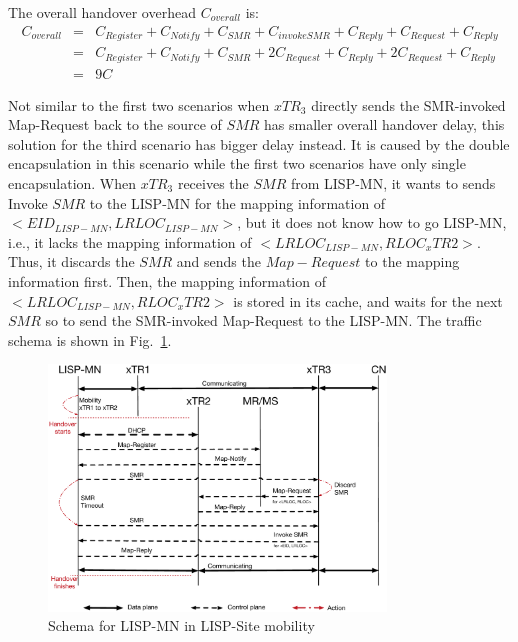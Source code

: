 {The overall handover overhead $C_{overall}$ is:
\begin{eqnarray}
C_{overall} &=& C_{Register} + C_{Notify} + C_{SMR} + C_{invokeSMR} + C_{Reply} + C_{Request} + C_{Reply} \nonumber \\
&=& C_{Register} + C_{Notify} + C_{SMR} + 2C_{Request} + C_{Reply} + 2C_{Request} + C_{Reply} \nonumber \\
&=& 9 C
\end{eqnarray}

Not similar to the first two scenarios when $xTR_3$ directly sends the SMR-invoked Map-Request back to the source of $SMR$ has smaller overall handover delay, this solution for the third scenario has bigger delay instead. It is caused by the double encapsulation in this scenario while the first two scenarios have only single encapsulation. When $xTR_3$ receives the $SMR$ from LISP-MN, it wants to sends Invoke $SMR$ to the LISP-MN for the mapping information of $<EID_{LISP-MN}, LRLOC_{LISP-MN}>$, but it does not know how to go LISP-MN, i.e., it lacks the mapping information of $<LRLOC_{LISP-MN}, RLOC_xTR2>$. Thus, it discards the $SMR$ and sends the $Map-Request$ to the mapping information first. Then, the mapping information of $<LRLOC_{LISP-MN}, RLOC_xTR2>$ is stored in its cache, and waits for the next $SMR$ so to send the SMR-invoked Map-Request to the LISP-MN. The traffic schema is shown in Fig.~\ref{Mobility_double_encap_schema_SMR_askxTR_simplify}.
\begin{figure}[!th]
	\centering
	\includegraphics[width=0.8\textwidth]{Pics/Mobility_double_encap_schema_SMR_askxTR_simplify}
	\caption{Schema for LISP-MN in LISP-Site mobility}
	\label{Mobility_double_encap_schema_SMR_askxTR_simplify}
\end{figure}

}
